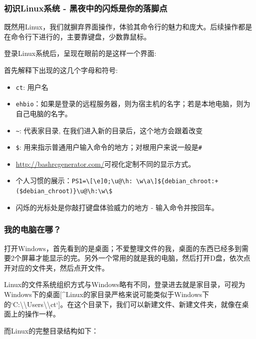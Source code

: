 \documentclass[]{article}
\providecommand{\tightlist}{%
  \setlength{\itemsep}{0pt}\setlength{\parskip}{0pt}}
\numberwithin{figure}{section}
\numberwithin{table}{section}
\begin{document}
\hypertarget{linux_cmd}{%
\subsubsection{初识Linux系统 - 黑夜中的闪烁是你的落脚点}\label{linux_cmd}}

既然用Linux，我们就摒弃界面操作，体验其命令行的魅力和庞大。后续操作都是在命令行下进行的，主要靠键盘，少数靠鼠标。

登录Linux系统后，呈现在眼前的是这样一个界面:

首先解释下出现的这几个字母和符号:

\begin{itemize}
\tightlist
\item
  \texttt{ct}: 用户名
\item
  \texttt{ehbio}：如果是登录的远程服务器，则为宿主机的名字；若是本地电脑，则为自己电脑的名字。
\item
  \texttt{\textasciitilde{}}: 代表家目录, 在我们进入新的目录后，这个地方会跟着改变
\item
  \texttt{\$}: 用来指示普通用户输入命令的地方；对根用户来说一般是\texttt{\#}
\item
  \url{http://bashrcgenerator.com/}可视化定制不同的显示方式。
\item
  个人习惯的展示：\texttt{PS1=\textbackslash{}{[}\textbackslash{}e{]}0;\textbackslash{}u@\textbackslash{}h:\ \textbackslash{}w\textbackslash{}a\textbackslash{}{]}\$\{debian\_chroot:+(\$debian\_chroot)\}\textbackslash{}u@\textbackslash{}h:\textbackslash{}w\textbackslash{}\$}
\item
  闪烁的光标处是你敲打键盘体验威力的地方 - 输入命令并按回车。
\end{itemize}

\hypertarget{my_computer}{%
\subsubsection{我的电脑在哪？}\label{my_computer}}

打开Windows，首先看到的是桌面；不爱整理文件的我，桌面的东西已经多到需要2个屏幕才能显示的完。另外一个常用的就是我的电脑，然后打开D盘，依次点开对应的文件夹，然后点开文件。

Linux的文件系统组织方式与Windows略有不同，登录进去就是家目录，可视为Windows下的桌面{[}\^{}Linux的家目录严格来说可能类似于Windows下的`C:\textbackslash\textbackslash Users\textbackslash\textbackslash ct`{]}。在这个目录下，我们可以新建文件、新建文件夹，就像在桌面上的操作一样。

而Linux的完整目录结构如下：
\end{document}
